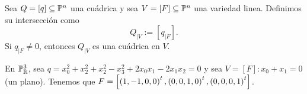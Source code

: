 
\begin{defi}
    Sea $Q= \left[ q \right] \subseteq \mathbb{P} ^n$ una cuádrica y sea $V = \left[ F \right] \subseteq \mathbb{P} ^n$ una variedad linea. Definimos su intersección como
    \[
        Q_{|V} := \left[q_{|F} \right].
    \]
    Si $q_{|F} \neq 0$, entonces $Q_{|V}$ es una cuádrica en $V$.
\end{defi}

\begin{example}
    En $\mathbb{P} _{\mathbb{R}} ^3$, sea $q=x_0^2+x_2^2+x_2^2-x_3^2+2x_0x_1-2x_1x_2=0$ y sea $V=\left[ F \right] \colon x_0+x_1=0$ (un plano). Tenemos que $F=\left[ \left( 1, -1, 0, 0 \right) ^t, \left( 0, 0, 1, 0 \right) ^t, \left( 0, 0, 0, 1 \right) ^t \right]$.
\end{example}
